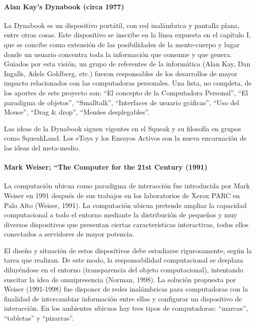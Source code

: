 \paragraph {Alan Kay's Dynabook (circa 1977)} 

La Dynabook es un dispositivo portátil, con red inalámbrica y pantalla plana,
entre otras
cosas. Este dispositivo se inscribe en la línea expuesta en el capítulo I, que
se concibe
como extensión de las posibilidades de la mente-cuerpo y lugar donde un usuario
concentra toda la información que consume y que genera.
Guiados por esta visión, un grupo de referentes de la informática (Alan Kay, Dan
Ingalls, Adele Goldberg, etc.) fueron responsables de los desarrollos de mayor
impacto
relacionados con las computadoras personales. Una lista, no completa, de los
aportes de
este proyecto son: “El concepto de la Computadora Personal”, “El paradigma de
objetos”, “Smalltalk”, “Interfaces de usuario gráficas”, “Uso del Mouse”, “Drag
&
drop”, “Menúes desplegables”.

Las ideas de la Dynabook siguen vigentes en el Squeak y su filosofía en grupos
como
SqueakLand. Los eToys y los Ensayos Activos son la nueva encarnación de las
ideas
del meta-medio.


\paragraph {Mark Weiser; “The Computer for the 21st Century (1991)}  

La computación ubicua como paradigma de interacción fue introducida por Mark
Weiser en 1991 después de sus trabajos en los laboratorios de Xerox PARC en Palo
Alto (Weiser, 1991). La computación ubicua pretende ampliar la capacidad
computacional a todo el entorno mediante la distribución de pequeños y muy
diversos
dispositivos que presentan ciertas características interactivas, todos ellos
conectados a
servidores de mayor potencia.


El diseño y situación de estos dispositivos debe estudiarse rigurosamente, según
la tarea
que realizan. De este modo, la responsabilidad computacional se desplaza
diluyéndose
en el entorno (transparencia del objeto computacional), intentando suscitar la
idea de
omnipresencia (Norman, 1998). La solución propuesta por Weiser (1991-1998) fue
disponer de redes inalámbricas para computadoras con la finalidad de
intercambiar
información entre ellas y configurar un dispositivo de interacción. En los
ambientes
ubicuos hay tres tipos de computadoras: “marcas”, “tabletas” y “pizarras”.

